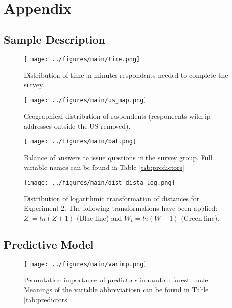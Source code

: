 \section{Appendix}

\subsection{Sample Description}



\begin{figure}[ht!]
  \centering
  \texttt{[image: ../figures/main/time.png]}
  \caption{Distribution of time in minutes respondents needed to complete the survey.}
  \label{fig:time}
\end{figure}

\begin{figure}[ht!]
  \centering
  \texttt{[image: ../figures/main/us\_map.png]}
  \caption{Geographical distribution of respondents (respondents with ip addresses outside the US removed).}
  \label{fig:map}
\end{figure}

\begin{figure}[ht!]
  \centering
  \texttt{[image: ../figures/main/bal.png]}
  \caption{Balance of answers to issue questions in the survey group. Full variable names can be found in Table \ref{tab:predictors}}
  \label{fig:bal}
\end{figure}

\begin{figure}[ht!]
  \centering
  \texttt{[image: ../figures/main/dist\_dista\_log.png]}
  \caption{Distribution of logarithmic transformation of distances for Experiment 2. The following transformations have been applied: $Z_t = ln(Z + 1)$ (Blue line) and $W_t = ln(W + 1)$ (Green line).}
  \label{fig:d_dist_log}
\end{figure}



\clearpage

\subsection{Predictive Model}

\begin{figure}[ht!]
  \centering
  \texttt{[image: ../figures/main/varimp.png]}
  \caption{Permutation importance of predictors in random forest model. Meanings of the variable abbreviatiosn can be found in Table \ref{tab:predictors}.}
  \label{fig:imp}
\end{figure}

